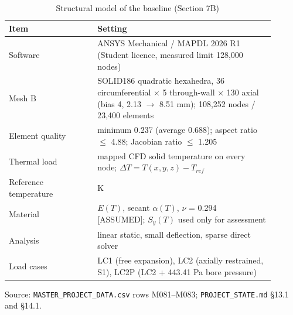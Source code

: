 \begin{table}[htbp]
\centering
\footnotesize
\caption{Structural model of the baseline (Section 7B)}
\label{tab:smodel}
\begin{tabular}{>{\raggedright\arraybackslash}p{0.30\linewidth}>{\raggedright\arraybackslash}p{0.60\linewidth}}
\toprule
Item & Setting \\
\midrule
Software & ANSYS Mechanical / MAPDL 2026 R1 (Student licence, measured limit 128,000 nodes) \\
Mesh B & SOLID186 quadratic hexahedra, 36 circumferential $\times$ 5 through-wall $\times$ 130 axial (bias 4, 2.13 $\rightarrow$ 8.51 mm); 108,252 nodes / 23,400 elements \\
Element quality & minimum 0.237 (average 0.688); aspect ratio $\le$ 4.88; Jacobian ratio $\le$ 1.205 \\
Thermal load & mapped CFD solid temperature on every node; $\Delta T = T(x,y,z) - T_{ref}$ \\
Reference temperature & 300 K \\
Material & $E(T)$, secant $\alpha(T)$, $\nu$ = 0.294 [ASSUMED]; $S_y(T)$ used only for assessment \\
Analysis & linear static, small deflection, sparse direct solver \\
Load cases & LC1 (free expansion), LC2 (axially restrained, S1), LC2P (LC2 + 443.41 Pa bore pressure) \\
\bottomrule
\end{tabular}
\par\smallskip\parbox{\linewidth}{\footnotesize\raggedright Source: \texttt{MASTER\_PROJECT\_DATA.csv} rows M081--M083; \texttt{PROJECT\_STATE.md} \S13.1 and \S14.1.}
\end{table}
